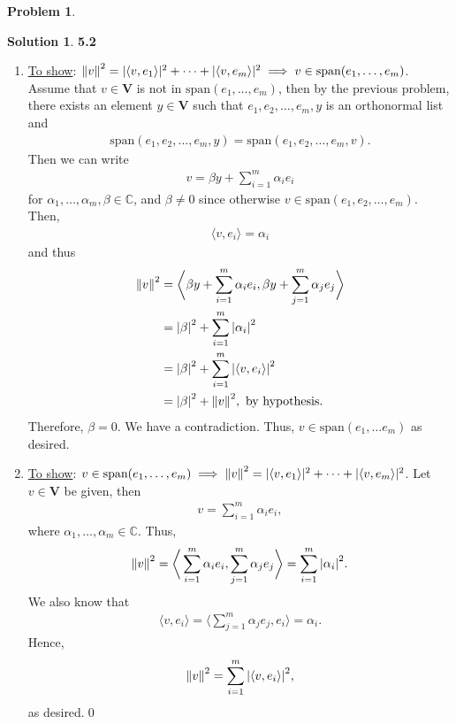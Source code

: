 \documentclass{article}
\theoremstyle{definition}
\newtheorem*{prob*}{Problem}
\newtheorem*{sln*}{Solution}
\newcommand{\V}{\mathbf{V}}
\newcommand{\xpan}{\text{span}}
\newcommand{\la}{\langle}
\newcommand{\ra}{\rangle}
\begin{document}
\begin{prob*}
\begin{enumerate}
		\begin{sln*}\textbf{5.2}
			\begin{enumerate}
				\item \underline{To show}: $\norm{v}^2= \vert \la v, e_1 \ra \vert^2 + \dots + \vert \la v, e_m \ra \vert^2 \implies v\in \xpan(e_1,\dots,e_m)$. Assume that $v\in\V$ is not in $\xpan(e_1,\dots,e_m)$, then by the previous problem, there exists an element $y\in \V$ such that $e_1,e_2,\dots,e_m,y$ is an orthonormal list and 
				\begin{align*}
				\xpan(e_1,e_2,\dots,e_m,y) = \xpan(e_1,e_2,\dots,e_m,v). 
				\end{align*}
				Then we can write
				\begin{align*}
				v = \beta y + \sum^m_{i=1}\alpha_i e_i 
				\end{align*}
				for $\alpha_1,\dots,\alpha_m, \beta \in \mathbb{C}$, and $\beta \neq 0$ since otherwise $v\in \xpan(e_1,e_2,\dots,e_m)$. Then,
				\begin{align*}
				\la v,e_i \ra = \alpha_i
				\end{align*}
				and thus
				\begin{align*}
				\norm{v}^2 &= \bigg\la \beta y + \sum^m_{i=1}\alpha_i e_i ,\beta y + \sum^m_{j=1}\alpha_j e_j   \bigg\ra\\
				&= \abs{\beta}^2 + \sum^m_{i=1}\abs{\alpha_i}^2\\
				&= \abs{\beta}^2 + \sum^m_{i=1}\abs{\la v,e_i \ra}^2\\
				&= \abs{\beta}^2 + \norm{v}^2, \text{ by hypothesis.}
				\end{align*}
				Therefore, $\beta = 0$. We have a contradiction. Thus, $v\in \xpan(e_1, \dots e_m)$ as desired.
				
				
				
				\item \underline{To show}: $v\in \xpan(e_1,\dots,e_m) \implies \norm{v}^2= \vert \la v, e_1 \ra \vert^2 + \dots + \vert \la v, e_m \ra \vert^2$. Let $v\in \V$ be given, then
				\begin{align*}
				v = \sum^m_{i=1}\alpha_i e_i,
				\end{align*}
				where $\alpha_1,\dots,\alpha_m \in \mathbb{C}$. Thus,
				\begin{align*}
				\norm{v}^2 = \bigg\la \sum^m_{i=1}\alpha_i e_i, \sum^m_{j=1}\alpha_j e_j \bigg\ra = \sum^m_{i=1}\abs{\alpha_i}^2.
				\end{align*}
				We also know that
				\begin{align*}
				\la v, e_i \ra = \bigg\la \sum^m_{j=1}\alpha_j e_j , e_i\bigg\ra = \alpha_i.
				\end{align*}
				Hence, 
				\begin{align*}
				\norm{v}^2 = \sum^m_{i=1}\abs{\la v, e_i \ra}^2,
				\end{align*}
				as desired.\qed
				
				
				
			\end{enumerate}
		\end{sln*}
	\end{enumerate}
\end{prob*}
\end{document}
